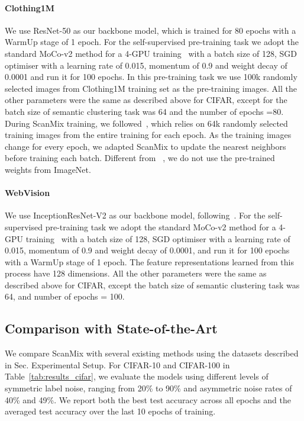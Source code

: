 \documentclass[review]{elsarticle}
\theoremstyle{plain}
\begin{document}
\paragraph{Clothing1M} We use ResNet-50 as our backbone model, which is trained for 80 epochs with a WarmUp stage of 1 epoch. For the self-supervised pre-training task we adopt the standard MoCo-v2 method for a 4-GPU training~\citep{MoCoV2} with a batch size of 128, SGD optimiser with a learning rate of 0.015, momentum of 0.9 and weight decay of 0.0001 and run it for 100 epochs. In this pre-training task we use 100k randomly selected images from Clothing1M training set as the pre-training images. All the other parameters were the same as described above for CIFAR, except for the batch size of semantic clustering task was 64 and the number of epochs =80. During ScanMix training, we followed~\citep{li2020dividemix}, which relies on 64k randomly selected training images from the entire training for each epoch. As the training images change for every epoch, we adapted ScanMix to update the nearest neighbors before training each batch. Different from ~\citep{li2020dividemix}, we do not use the pre-trained weights from ImageNet.


\paragraph{WebVision}
We use InceptionResNet-V2 as our backbone model, following~\citep{li2020dividemix}. For the self-supervised pre-training task we adopt the standard MoCo-v2 method for a 4-GPU training~\citep{MoCoV2} with a batch size of 128, SGD optimiser with a learning rate of 0.015, momentum of 0.9 and weight decay of 0.0001, and run it for 100 epochs with a WarmUp stage of 1 epoch. The feature representations learned from this process have 128 dimensions. All the other parameters were the same as described above for CIFAR, except the batch size of semantic clustering task was 64, and number of epochs  = 100. 



\subsection{Comparison with State-of-the-Art}
\label{sec:comparison_SOTA}

We compare ScanMix with several existing methods using the datasets described in Sec. Experimental Setup. For CIFAR-10 and CIFAR-100 in Table~\ref{tab:results_cifar}, we evaluate the models using different  levels  of  symmetric  label  noise, ranging from  20\%  to  90\% and asymmetric noise rates of 40\% and 49\%.  We report both the best test accuracy across all epochs and the averaged test accuracy over the last 10 epochs of training.  
\end{document}
